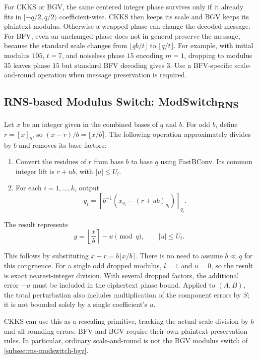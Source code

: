 For CKKS or BGV, the same centered integer phase survives only if it already fits in $[-q/2,q/2)$ coefficient-wise. CKKS then keeps its scale and BGV keeps its plaintext modulus. Otherwise a wrapped phase can change the decoded message. For BFV, even an unchanged phase does not in general preserve the message, because the standard scale changes from $\lfloor qb/t\rfloor$ to $\lfloor q/t\rfloor$. For example, with initial modulus $105$, $t=7$, and noiseless phase $15$ encoding $m=1$, dropping to modulus $35$ leaves phase $15$ but standard BFV decoding gives $3$. Use a BFV-specific scale-and-round operation when message preservation is required.

\subsection{RNS-based Modulus Switch: \textsf{ModSwitch\textsubscript{RNS}}}
\label{subsec:rns-modswitch}

Let $x$ be an integer given in the combined bases of $q$ and $b$. For odd $b$, define $r=[x]_b$, so $(x-r)/b=\lfloor x/b\rceil$. The following operation approximately divides by $b$ and removes its base factors:
\begin{tcolorbox}[title={\textbf{\tboxlabel{\ref*{subsec:rns-modswitch}} \textsf{ModSwitch\textsubscript{RNS}}}}]
\begin{enumerate}
\item Convert the residues of $r$ from base $b$ to base $q$ using \textsf{FastBConv}. Its common integer lift is $r+ub$, with $|u|\leq U_l$.
\item For each $i=1,\ldots,k$, output
\[
y_i=[b^{-1}(x_{q_i}-(r+ub)_{q_i})]_{q_i}.
\]
\end{enumerate}
The result represents
\[
y=\left\lfloor\frac{x}{b}\right\rceil-u\pmod q,\qquad |u|\leq U_l.
\]
\end{tcolorbox}

This follows by substituting $x-r=b\lfloor x/b\rceil$. There is no need to assume $b\ll q$ for this congruence. For a single odd dropped modulus, $l=1$ and $u=0$, so the result is exact nearest-integer division. With several dropped factors, the additional error $-u$ must be included in the ciphertext phase bound. Applied to $(A,B)$, the total perturbation also includes multiplication of the component errors by $S$; it is not bounded solely by a single coefficient's $u$.

CKKS can use this as a rescaling primitive, tracking the actual scale division by $b$ and all rounding errors. BFV and BGV require their own plaintext-preservation rules. In particular, ordinary scale-and-round is not the BGV modulus switch of \autoref{subsec:rns-modswitch-bgv}.

